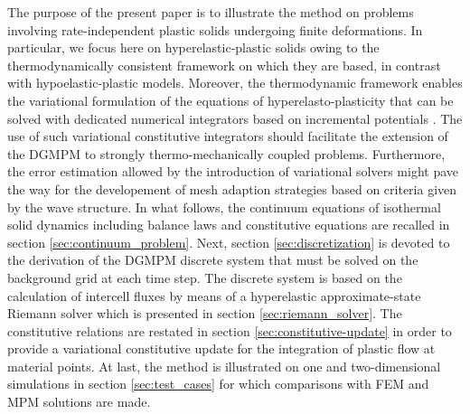 The purpose of the present paper is to illustrate the method on problems involving rate-independent plastic solids undergoing finite deformations.
In particular, we focus here on hyperelastic-plastic solids owing to the thermodynamically consistent framework on which they are based, in contrast with hypoelastic-plastic models. 
Moreover, the thermodynamic framework enables the variational formulation of the equations of hyperelasto-plasticity that can be solved with dedicated numerical integrators based on incremental potentials \cite{Laurent99}.
The use of such variational constitutive integrators should facilitate the extension of the DGMPM to strongly thermo-mechanically coupled problems.
Furthermore, the error estimation allowed by the introduction of variational solvers might pave the way for the developement of mesh adaption strategies based on criteria given by the wave structure.
In what follows, the continuum equations of isothermal solid dynamics including balance laws and constitutive equations are recalled in section \ref{sec:continuum_problem}.
Next, section \ref{sec:discretization} is devoted to the derivation of the DGMPM discrete system that must be solved on the background grid at each time step. 
The discrete system is based on the calculation of intercell fluxes by means of a hyperelastic approximate-state Riemann solver which is presented in section \ref{sec:riemann_solver}.
The constitutive relations are restated in section \ref{sec:constitutive-update} in order to provide a variational constitutive update for the integration of plastic flow at material points.
At last, the method is illustrated on one and two-dimensional simulations in section \ref{sec:test_cases} for which comparisons with FEM and MPM solutions are made.


